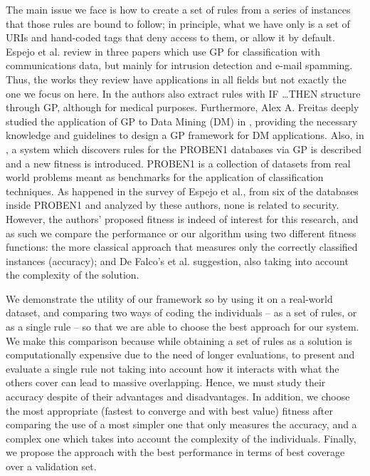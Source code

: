 \documentclass[runningheads]{llncs}
\begin{document}
The main issue we face is how to create a set of rules from a series
of instances that those rules are bound to follow; in principle, what
we have only is a set of URIs and hand-coded tags that deny access to
them, or allow it by default.  Espejo et al. review in
\cite{espejo2010survey} three papers which use GP for classification
with communications data, but mainly for intrusion detection and
e-mail spamming. Thus, the works they review have applications in all
fields but not exactly the one we focus on here. In
\cite{Tsakonas2004195} the authors also extract rules with \textsc{IF
\ldots THEN} structure through GP, although for medical
purposes. Furthermore, Alex A. Freitas deeply studied the application
of GP to Data Mining (DM) in \cite{freitas2002data}, providing the
necessary knowledge and guidelines to design a GP framework for DM
applications. Also, in \cite{DeFalco2002257}, a system which discovers
rules for the PROBEN1 databases via GP is described and a new fitness
is introduced. PROBEN1 \cite{prechelt1994proben} is a collection of
datasets from real world problems meant as benchmarks for the
application of classification techniques. As happened in the survey of
Espejo et al., from six of the databases inside PROBEN1 and analyzed
by these authors, none is related to security. However, the authors'
proposed fitness is indeed of interest for this research, and as such
we compare the performance or our algorithm using two different
fitness functions: the more classical approach that measures only the
correctly classified instances (accuracy); and De Falco's et
al. \cite{DeFalco2002257} suggestion, also taking into account the
complexity of the solution.


We demonstrate the utility of our framework so by using it on a
real-world dataset, and comparing two 
ways of coding the individuals -- as a set of rules, or as a single
rule -- so that we are able to choose the best approach for our
system. We make this comparison because while obtaining a set of rules
as a solution is computationally expensive due to the need of longer
evaluations, to present and evaluate a single rule not taking into
account how it interacts with what the others cover
\cite{freitas2002data} can lead to massive overlapping. Hence, we must
study their accuracy despite of their advantages and disadvantages. In
addition, we choose the most appropriate (fastest to converge and with
best value) fitness after comparing the use of a most simpler one that
only measures the accuracy, and a complex one which takes into account
the complexity of the individuals. Finally, we propose the approach
with the best performance in terms of best coverage over a validation
set.
\end{document}

